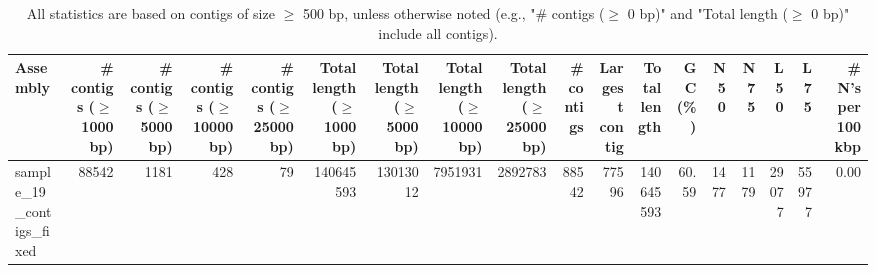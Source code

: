 \documentclass[12pt,a4paper]{article}
\begin{document}
\begin{table}[ht]
\begin{center}
\caption{All statistics are based on contigs of size $\geq$ 500 bp, unless otherwise noted (e.g., "\# contigs ($\geq$ 0 bp)" and "Total length ($\geq$ 0 bp)" include all contigs).}
\begin{tabular}{|l*{17}{|r}|}
\hline
Assembly & \# contigs ($\geq$ 1000 bp) & \# contigs ($\geq$ 5000 bp) & \# contigs ($\geq$ 10000 bp) & \# contigs ($\geq$ 25000 bp) & Total length ($\geq$ 1000 bp) & Total length ($\geq$ 5000 bp) & Total length ($\geq$ 10000 bp) & Total length ($\geq$ 25000 bp) & \# contigs & Largest contig & Total length & GC (\%) & N50 & N75 & L50 & L75 & \# N's per 100 kbp \\ \hline
sample\_19\_contigs\_fixed & 88542 & 1181 & 428 & 79 & 140645593 & 13013012 & 7951931 & 2892783 & 88542 & 77596 & 140645593 & 60.59 & 1477 & 1179 & 29077 & 55977 & 0.00 \\ \hline
\end{tabular}
\end{center}
\end{table}
\end{document}
